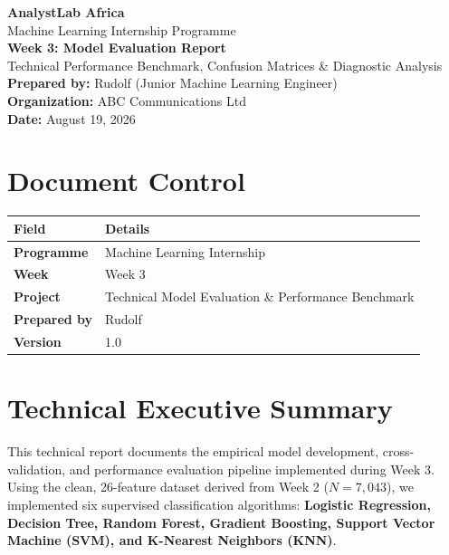 \documentclass[11pt,a4paper]{article}
\begin{document}
\begin{center}
    {\huge \bfseries \color{primary} AnalystLab Africa}\\[0.2cm]
    {\large Machine Learning Internship Programme}\\[0.3cm]
    {\Large \bfseries Week 3: Model Evaluation Report}\\[0.1cm]
    {\textcolor{secondary}{Technical Performance Benchmark, Confusion Matrices \& Diagnostic Analysis}}\\[0.4cm]
    \textbf{Prepared by:} Rudolf (Junior Machine Learning Engineer) \\
    \textbf{Organization:} ABC Communications Ltd \\
    \textbf{Date:} August 19, 2026
\end{center}

\vspace{0.3cm}

\section*{Document Control}
\begin{table}[h!]
\centering
\begin{tabular}{|l|p{10cm}|}
\hline
\rowcolor{lightbg} \textbf{Field} & \textbf{Details} \\ \hline
\textbf{Programme} & Machine Learning Internship \\ \hline
\textbf{Week} & Week 3 \\ \hline
\textbf{Project} & Technical Model Evaluation \& Performance Benchmark \\ \hline
\textbf{Prepared by} & Rudolf \\ \hline
\textbf{Version} & 1.0 \\ \hline
\end{tabular}
\end{table}

\section{Technical Executive Summary}
This technical report documents the empirical model development, cross-validation, and performance evaluation pipeline implemented during Week 3. Using the clean, 26-feature dataset derived from Week 2 ($N=7,043$), we implemented six supervised classification algorithms: \textbf{Logistic Regression, Decision Tree, Random Forest, Gradient Boosting, Support Vector Machine (SVM), and K-Nearest Neighbors (KNN)}. 
\end{document}
